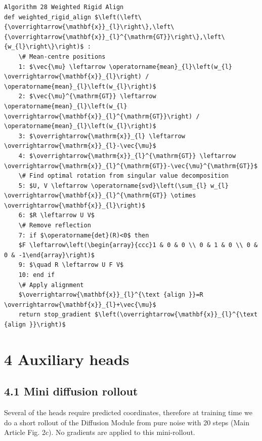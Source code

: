 \documentclass[10pt]{article}
\begin{document}
\begin{verbatim}
Algorithm 28 Weighted Rigid Align
def weighted_rigid_align $\left(\left\{\overrightarrow{\mathbf{x}}_{l}\right\},\left\{\overrightarrow{\mathbf{x}}_{l}^{\mathrm{GT}}\right\},\left\{w_{l}\right\}\right)$ :
    \# Mean-centre positions
    1: $\vec{\mu} \leftarrow \operatorname{mean}_{l}\left(w_{l} \overrightarrow{\mathbf{x}}_{l}\right) / \operatorname{mean}_{l}\left(w_{l}\right)$
    2: $\vec{\mu}^{\mathrm{GT}} \leftarrow \operatorname{mean}_{l}\left(w_{l} \overrightarrow{\mathbf{x}}_{l}^{\mathrm{GT}}\right) / \operatorname{mean}_{l}\left(w_{l}\right)$
    3: $\overrightarrow{\mathrm{x}}_{l} \leftarrow \overrightarrow{\mathrm{x}}_{l}-\vec{\mu}$
    4: $\overrightarrow{\mathrm{x}}_{l}^{\mathrm{GT}} \leftarrow \overrightarrow{\mathrm{x}}_{l}^{\mathrm{GT}}-\vec{\mu}^{\mathrm{GT}}$
    \# Find optimal rotation from singular value decomposition
    5: $U, V \leftarrow \operatorname{svd}\left(\sum_{l} w_{l} \overrightarrow{\mathbf{x}}_{l}^{\mathrm{GT}} \otimes \overrightarrow{\mathbf{x}}_{l}\right)$
    6: $R \leftarrow U V$
    \# Remove reflection
    7: if $\operatorname{det}(R)<0$ then
    $F \leftarrow\left(\begin{array}{ccc}1 & 0 & 0 \\ 0 & 1 & 0 \\ 0 & 0 & -1\end{array}\right)$
    9: $\quad R \leftarrow U F V$
    10: end if
    \# Apply alignment
    $\overrightarrow{\mathbf{x}}_{l}^{\text {align }}=R \overrightarrow{\mathbf{x}}_{l}+\vec{\mu}$
    return stop_gradient $\left(\overrightarrow{\mathbf{x}}_{l}^{\text {align }}\right)$
\end{verbatim}

\section*{4 Auxiliary heads}
\subsection*{4.1 Mini diffusion rollout}
Several of the heads require predicted coordinates, therefore at training time we do a short rollout of the Diffusion Module from pure noise with 20 steps (Main Article Fig. 2c). No gradients are applied to this mini-rollout.
\end{document}
